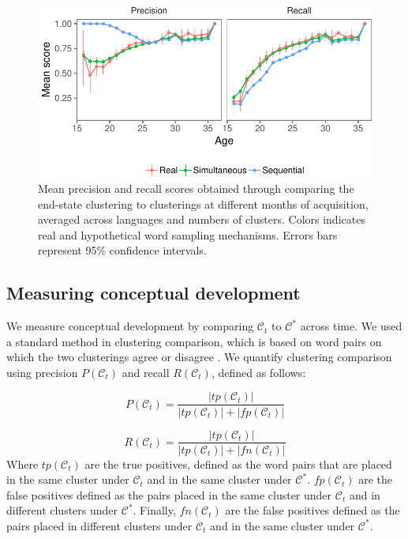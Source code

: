 \documentclass[11pt]{article}
\newenvironment{CodeChunk}{}{}
\begin{document}
\begin{CodeChunk}
\captionsetup{width=0.8\textwidth}\begin{figure}[h]

{\centering \includegraphics{figs/results-1} 

}

\caption[Mean precision and recall scores obtained through comparing the end-state clustering to clusterings at different months of acquisition, averaged across languages and numbers of clusters]{Mean precision and recall scores obtained through comparing the end-state clustering to clusterings at different months of acquisition, averaged across languages and numbers of clusters. Colors indicates real and hypothetical word sampling mechanisms. Errors bars represent 95\% confidence intervals.}\label{fig:results}
\end{figure}
\end{CodeChunk}

\subsection{Measuring conceptual
development}\label{measuring-conceptual-development}

We measure conceptual development by comparing \(\mathcal{C}_t\) to
\(\mathcal{C}^*\) across time. We used a standard method in clustering
comparison, which is based on word pairs on which the two clusterings
agree or disagree \cite{rand1971,hubert1985}. We quantify clustering
comparison using precision \(P(\mathcal{C}_t)\) and recall
\(R(\mathcal{C}_t)\), defined as follows:

\[
P(\mathcal{C}_t) = \frac{|tp(\mathcal{C}_t)|}{|tp(\mathcal{C}_t)| + |fp(\mathcal{C}_t)|}
\]

\[
R(\mathcal{C}_t) = \frac{|tp(\mathcal{C}_t)|}{|tp(\mathcal{C}_t)| + |fn(\mathcal{C}_t)|}
\] Where \(tp(\mathcal{C}_t)\) are the true positives, defined as the
word pairs that are placed in the same cluster under \(\mathcal{C}_t\)
and in the same cluster under \(\mathcal{C}^*\). \(fp(\mathcal{C}_t)\)
are the false positives defined as the pairs placed in the same cluster
under \(\mathcal{C}_t\) and in different clusters under
\(\mathcal{C}^*\). Finally, \(fn(\mathcal{C}_t)\) are the false
positives defined as the pairs placed in different clusters under
\(\mathcal{C}_t\) and in the same cluster under \(\mathcal{C}^*\).
\end{document}
